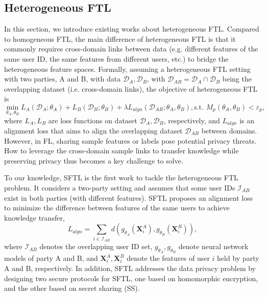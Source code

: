 \documentclass[11pt]{article}
\begin{document}
\subsection{Heterogeneous FTL}
In this section, we introduce existing works about heterogeneous FTL. Compared to homogeneous FTL, the main difference of heterogeneous FTL is that it commonly requires cross-domain links between data (e.g. different features of the same user ID, the same features from different users, etc.) to bridge the heterogeneous feature spaces. Formally, assuming a heterogeneous FTL setting with two parties, A and B, with data $\mathcal{D}_A, \mathcal{D}_B$, with $\mathcal{D}_{AB}=\mathcal{D}_A\cap \mathcal{D}_B$ being the overlapping dataset (i.e. cross-domain links), the objective of heterogeneous FTL is 
\begin{equation}
    \min_{\theta_A, \theta_B} L_{A}(\mathcal{D}_A;\theta_A) + L_B(\mathcal{D}_B;\theta_B) + \lambda L_{algn}(\mathcal{D}_{AB};\theta_A, \theta_B), \text{s.t. } M_p(\theta_A, \theta_B)< \varepsilon_p,
\end{equation}
where $L_A, L_B$ are loss functions on dataset $\mathcal{D}_A, \mathcal{D}_B$, respectively, and $L_{algn}$ is an alignment loss that aims to align the overlapping dataset $\mathcal{D}_{AB}$ between domains. However, in FL, sharing sample features or labels pose potential privacy threats. How to leverage the cross-domain sample links to transfer knowledge while preserving privacy thus becomes a key challenge to solve. 

To our knowledge, SFTL \cite{liu2020secure} is the first work to tackle the heterogeneous FTL problem. It considers a two-party setting and assumes that some user IDs $\mathcal{I}_{AB}$ exist in both parties (with different features). SFTL proposes an alignment loss to minimize the difference between features of the same users to achieve knowledge transfer, 
\begin{equation}
    L_{algn} = \sum_{i\in\mathcal{I}_{AB}}d(g_{\theta_A}(\mathbf{X}_i^A), g_{\theta_B}(\mathbf{X}_i^B)),
\end{equation}
where $\mathcal{I}_{AB}$ denotes the overlapping user ID set, $g_{\theta_A}, g_{\theta_B}$ denote neural network models of party A and B, and $\mathbf{X}_i^A, \mathbf{X}_i^B$ denote the features of user $i$ held by party A and B, respectively. In addition, SFTL addresses the data privacy problem by designing two secure protocols for SFTL, one based on homomorphic encryption, and the other based on secret sharing (SS). 
\end{document}
